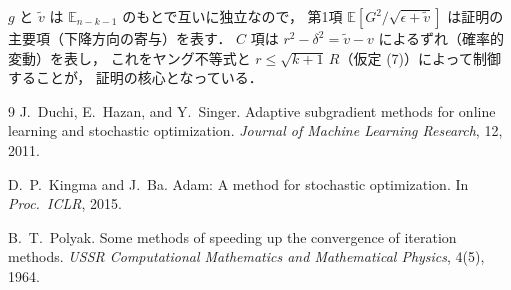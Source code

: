 \documentclass[dvipdfmx,a4paper,11pt]{jsarticle}
\begin{document}
\noindent
$g$ と $\tilde{v}$ は $\mathbb{E}_{n-k-1}$ のもとで互いに独立なので，
第1項 $\mathbb{E}[G^2/\sqrt{\epsilon+\tilde{v}}]$ は証明の主要項（下降方向の寄与）を表す．
$C$ 項は $r^2 - \delta^2 = \tilde{v} - v$ によるずれ（確率的変動）を表し，
これをヤング不等式と $r \leq \sqrt{k+1}\,R$（仮定 (7)）によって制御することが，
証明の核心となっている．


\newpage
\begin{thebibliography}{9}
J.~Duchi, E.~Hazan, and Y.~Singer.
\newblock Adaptive subgradient methods for online learning and stochastic optimization.
\newblock \textit{Journal of Machine Learning Research}, 12, 2011.

D.~P.~Kingma and J.~Ba.
\newblock Adam: A method for stochastic optimization.
\newblock In \textit{Proc.\ ICLR}, 2015.

B.~T.~Polyak.
\newblock Some methods of speeding up the convergence of iteration methods.
\newblock \textit{USSR Computational Mathematics and Mathematical Physics}, 4(5), 1964.
\end{thebibliography}
\end{document}
